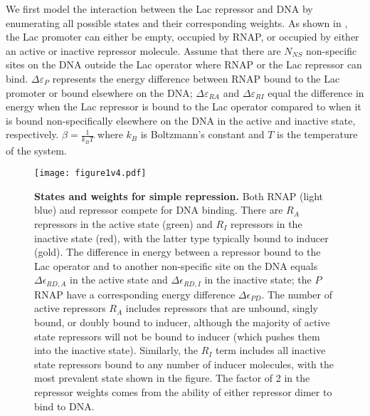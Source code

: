 We first model the interaction between the Lac repressor and DNA by enumerating
all possible states and their corresponding weights. As shown in
\fref[figpolymeraseRepressorStates], the Lac promoter can either be empty,
occupied by RNAP, or occupied by either an active or inactive repressor
molecule. Assume that there are $N_{NS}$ non-specific sites on the DNA outside
the Lac operator where RNAP or the Lac repressor can bind. \(\Delta\varepsilon_{P}\)
represents the energy difference between RNAP bound to the Lac promoter or bound
elsewhere on the DNA; \(\Delta\varepsilon_{RA}\) and \(\Delta\varepsilon_{RI}\) equal the
difference in energy when the Lac repressor is bound to the Lac operator
compared to when it is bound non-specifically elsewhere on the DNA in the active
and inactive state, respectively. $\beta = \frac{1}{k_BT}$ where $k_B$ is
Boltzmann's constant and $T$ is the temperature of the system.

\begin{figure}[h]
	\centering \texttt{[image: figure1v4.pdf]}
	\caption{{\bf States and weights for simple repression. } Both RNAP (light blue)
		and repressor compete for DNA binding. There are $R_A$ repressors in the active
		state (green) and $R_I$ repressors in the inactive state (red), with the latter
		type typically bound to inducer (gold). The difference in energy between a
		repressor bound to the Lac operator and to another non-specific site on the DNA
		equals $\Delta\epsilon_{RD,A}$ in the active state and $\Delta\epsilon_{RD,I}$
		in the inactive state; the $P$ RNAP have a corresponding energy difference
		$\Delta\epsilon_{PD}$. The number of active repressors $R_A$ includes
		repressors that are unbound, singly bound, or doubly bound to inducer, although
		the majority of active state repressors will not be bound to inducer (which
		pushes them into the inactive state). Similarly, the $R_I$ term includes all
		inactive state repressors bound to any number of inducer molecules, with the
		most prevalent state shown in the figure. The factor of 2 in the repressor
		weights comes from the ability of either repressor dimer to bind to DNA. }
	\label{figpolymeraseRepressorStates}
\end{figure}



